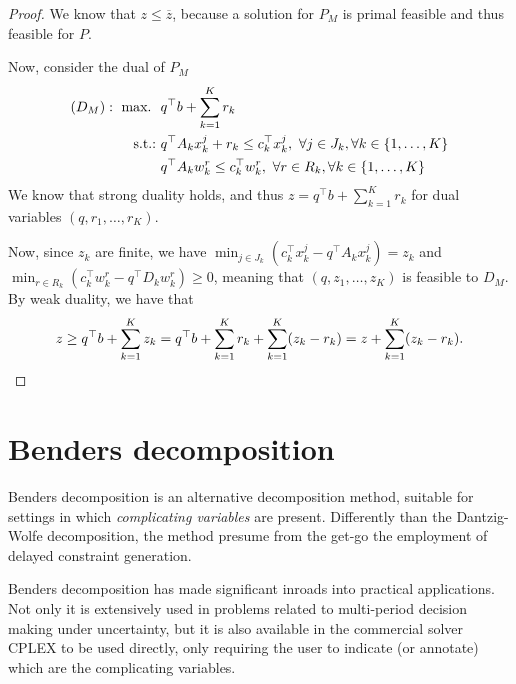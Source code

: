 \begin{proof}
	
	We know that $z \leq \overline{z}$, because a solution for $P_M$ is primal feasible and thus feasible for $P$.
	
	Now, consider the dual of $P_M$
	\begin{align*}
		(D_M): ~\mathop{\text{max.~}} \ & q^\top b + \sum_{k=1}^K r_k \\
		\mathop{\text{s.t.:~}} & q^\top A_k x_k^j + r_k \leq c_k^\top x_k^j, \ \forall j \in J_k, \forall k \in \left\{ 1,\dots, K \right \} \\
		& q^\top A_kw_k^r \leq c_k^\top w_k^r, \ \forall r \in R_k, \forall k \in \left\{ 1,\dots, K \right \} \\ 
	\end{align*}
	We know that strong duality holds, and thus $z = q^\top b + \sum_{k=1}^K r_k $ for dual variables $(q, r_1, \dots, r_K)$. 
	
	Now, since $z_k$ are finite, we have $\min_{j \in J_k}(c_k^\top x_k^j - q^\top A_k x_k^j) = z_k$ and $\min_{r \in R_k}(c_k^\top w_k^r - q^\top D_k w_k^r) \geq 0$, meaning that $(q, z_1, \dots, z_K)$ is feasible to $D_M$. By weak duality, we have that
	\begin{equation*}
		z \geq q^\top b + \sum_{k=1}^K	z_k = q^\top b + \sum_{k=1}^K r_k + \sum_{k=1}^K (z_k - r_k) = z + \sum_{k=1}^K (z_k - r_k). \qedhere	
	\end{equation*}
\end{proof}



\section{Benders decomposition}


Benders decomposition is an alternative decomposition method, suitable for settings in which \emph{complicating variables} are present. Differently than the Dantzig-Wolfe decomposition, the method presume from the get-go the employment of delayed constraint generation. 

Benders decomposition has made significant inroads into practical applications. Not only it is extensively used in problems related to multi-period decision making under uncertainty, but it is also available in the commercial solver CPLEX to be used directly, only requiring the user to indicate (or annotate) which are the complicating variables. 

